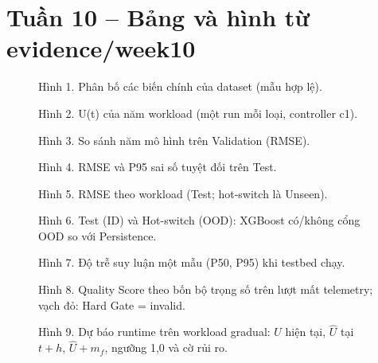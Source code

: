 \documentclass[11pt]{article}
\begin{document}
\section*{Tuần 10 -- Bảng và hình từ evidence/week10}












\begin{figure}[H]\centering

\caption*{Hình 1. Phân bố các biến chính của dataset (mẫu hợp lệ).}
\end{figure}

\begin{figure}[H]\centering

\caption*{Hình 2. U(t) của năm workload (một run mỗi loại, controller c1).}
\end{figure}

\begin{figure}[H]\centering

\caption*{Hình 3. So sánh năm mô hình trên Validation (RMSE).}
\end{figure}

\begin{figure}[H]\centering

\caption*{Hình 4. RMSE và P95 sai số tuyệt đối trên Test.}
\end{figure}

\begin{figure}[H]\centering

\caption*{Hình 5. RMSE theo workload (Test; hot-switch là Unseen).}
\end{figure}

\begin{figure}[H]\centering

\caption*{Hình 6. Test (ID) và Hot-switch (OOD): XGBoost có/không cổng OOD so với Persistence.}
\end{figure}

\begin{figure}[H]\centering

\caption*{Hình 7. Độ trễ suy luận một mẫu (P50, P95) khi testbed chạy.}
\end{figure}

\begin{figure}[H]\centering

\caption*{Hình 8. Quality Score theo bốn bộ trọng số trên lượt mất telemetry; vạch đỏ: Hard Gate = invalid.}
\end{figure}

\begin{figure}[H]\centering

\caption*{Hình 9. Dự báo runtime trên workload gradual: $U$ hiện tại, $\hat U$ tại $t+h$, $\hat U + m_f$, ngưỡng 1,0 và cờ rủi ro.}
\end{figure}
\end{document}
